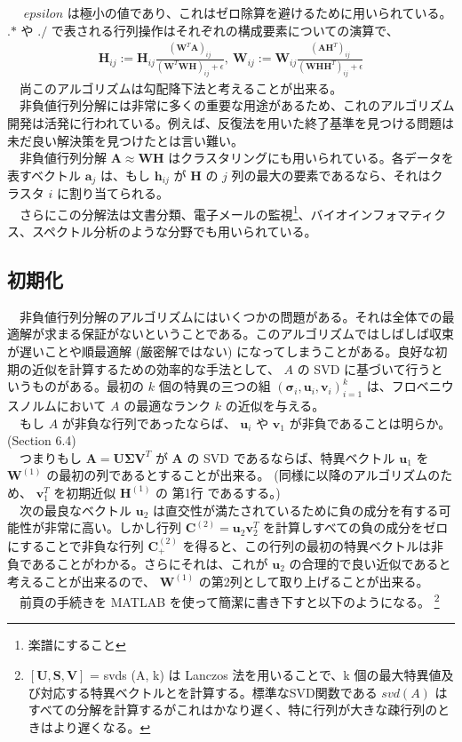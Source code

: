 \documentclass[a4paper,10pt]{jarticle}
\begin{document}
　 \(epsilon\) は極小の値であり、これはゼロ除算を避けるために用いられている。 .\(\ast\) や .\(\slash\) で表される行列操作はそれぞれの構成要素についての演算で、\\
\begin{align*}
\bm{H}_{ij} := \bm{H}_{ij}
\frac{(\bm{W}^T\bm{A})_{ij}}{{(\bm{W}^T\bm{W}\bm{H})_{ij}+\epsilon}},\ \bm{W}_{ij} := \bm{W}_{ij}\frac{(\bm{A}\bm{H}^T)_{ij}}{{(\bm{W}\bm{H}\bm{H}^T)_{ij}+ \epsilon}}
\end{align*}
　尚このアルゴリズムは勾配降下法と考えることが出来る。\\
　非負値行列分解には非常に多くの重要な用途があるため、これのアルゴリズム開発は活発に行われている。例えば、反復法を用いた終了基準を見つける問題は未だ良い解決策を見つけたとは言い難い。\\
　非負値行列分解 \(\bm{A}\approx \bm{W}\bm{H}\) はクラスタリングにも用いられている。各データを表すベクトル \(\bm{a}_j\) は、もし \(\bm{h}_{ij}\) が \(\bm{H}\) の \(j\) 列の最大の要素であるなら、それはクラスタ \(i\) に割り当てられる。\\
　さらにこの分解法は文書分類、電子メールの監視\footnote{楽譜にすること}、バイオインフォマティクス、スペクトル分析のような分野でも用いられている。\\
\subsection{初期化}
\label{sec:orgcfb858c}
　非負値行列分解のアルゴリズムにはいくつかの問題がある。それは全体での最適解が求まる保証がないということである。このアルゴリズムではしばしば収束が遅いことや順最適解 (厳密解ではない) になってしまうことがある。良好な初期の近似を計算するための効率的な手法として、 \(A\) の SVD に基づいて行うというものがある。最初の \(k\) 個の特異の三つの組 \((\bm{\sigma}_i,\bm{u}_i,\bm{v}_i)^k_{i=1}\) は、フロベニウスノルムにおいて \(A\) の最適なランク \(k\) の近似を与える。\\
　もし \(A\) が非負な行列であったならば、 \(\bm{u}_i\) や \(\bm{v}_1\) が非負であることは明らか。(Section 6.4)\\
　つまりもし \(\bm{A} =\bm{U}\bm{\Sigma}\bm{V}^T\) が \(\bm{A}\) の SVD であるならば、特異ベクトル \(\bm{u}_1\) を \(\bm{W}^{(1)}\) の最初の列であるとすることが出来る。 (同様に以降のアルゴリズムのため、 \(\bm{v}_1^T\) を初期近似 \(\bm{H}^{(1)}\) の 第1行 であるする。)\\
　次の最良なベクトル \(\bm{u}_2\) は直交性が満たされているために負の成分を有する可能性が非常に高い。しかし行列 \(\bm{C}^{(2)} = \bm{u}_2\bm{v}_2^T\) を計算しすべての負の成分をゼロにすることで非負な行列 \(\bm{C}^{(2)}_+\) を得ると、この行列の最初の特異ベクトルは非負であることがわかる。さらにそれは、これが \(\bm{u}_2\) の合理的で良い近似であると考えることが出来るので、 \(\bm{W}^{(1)}\) の第2列として取り上げることが出来る。\\
　前頁の手続きを MATLAB を使って簡潔に書き下すと以下のようになる。 \footnote{\([\bm{U},\bm{S}, \bm{V}]\) = svds (A, k) は Lanczos 法を用いることで、k 個の最大特異値及び対応する特異ベクトルとを計算する。標準なSVD関数である \(svd(A)\) はすべての分解を計算するがこれはかなり遅く、特に行列が大きな疎行列のときはより遅くなる。}\\
\end{document}
